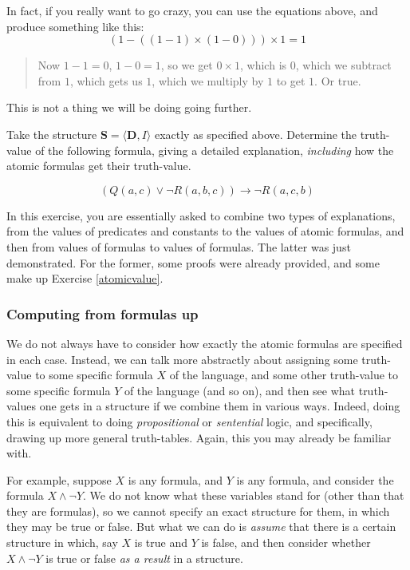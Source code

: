 In fact, if you really want to go crazy, you can use the equations above, and produce something like this: 
%
\[
(1 -((1-1) \times (1-0))) \times 1=1
\]
%
\begin{quote}%
Now $1-1=0$, $1-0=1$, so we get $0 \times 1$, which is $0$, which we subtract from $1$, which gets us $1$, which we multiply by $1$ to get $1$. Or true. 
\end{quote}

This is not a thing we will be doing going further. 

\begin{exc}
Take the structure $\mathbf{S}=\langle \mathbf{D}, I\rangle$ exactly as specified above. Determine the truth-value of the following formula, giving a detailed explanation, \textit{including} how the atomic formulas get their truth-value. 

\[
(Q(a, c) \vee \neg R(a, b, c)) \rightarrow \neg R(a, c, b)
\]
\end{exc}

\begin{remark}
	In this exercise, you are essentially asked to combine two types of explanations, from the values of predicates and constants to the values of atomic formulas, and then from values of formulas to values of formulas. The latter was just demonstrated. For the former, some proofs were already provided, and some make up Exercise \ref{atomicvalue}.
\end{remark}


\subsubsection{Computing from formulas up}

We do not always have to consider how exactly the atomic formulas are specified in each case. Instead, we can talk more abstractly about assigning some truth-value to some specific formula $X$ of the language, and some other truth-value to some specific formula $Y$ of the language (and so on), and then see what truth-values one gets in a structure if we combine them in various ways. Indeed, doing this is equivalent to doing \textit{propositional} or \textit{sentential} logic, and specifically, drawing up more general truth-tables. Again, this you may already be familiar with. 

For example, suppose $X$ is any formula, and $Y$ is any formula, and consider the formula $X \wedge \neg Y$. We do not know what these variables stand for (other than that they are formulas), so we cannot specify an exact structure for them, in which they may be true or false. But what we can do is \textit{assume} that there is a certain structure in which, say $X$ is true and $Y$ is false, and then consider whether $X \wedge \neg Y$ is true or false \textit{as a result} in a structure. 

